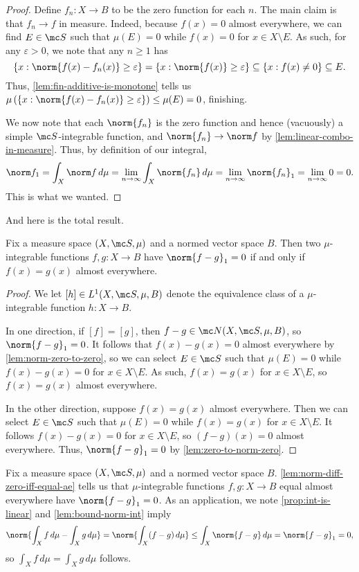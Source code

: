 \documentclass[../notes.tex]{subfiles}
\begin{document}
\begin{proof}
	Define $f_n\colon X\to B$ to be the zero function for each $n$. The main claim is that $f_n\to f$ in measure. Indeed, because $f(x)=0$ almost everywhere, we can find $E\in\mc S$ such that $\mu(E)=0$ while $f(x)=0$ for $x\in X\setminus E$. As such, for any $\varepsilon>0$, we note that any $n\ge1$ has
	\[\{x:\norm{f(x)-f_n(x)}\ge\varepsilon\}=\{x:\norm{f(x)}\ge\varepsilon\}\subseteq\{x:f(x)\ne0\}\subseteq E.\]
	Thus, \autoref{lem:fin-additive-is-monotone} tells us $\mu\left(\{x:\norm{f(x)-f_n(x)}\ge\varepsilon\}\right)\le\mu(E)=0$, finishing.
	
	We now note that each $\norm{f_n}$ is the zero function and hence (vacuously) a simple $\mc S$-integrable function, and $\norm{f_n}\to\norm f$ by \autoref{lem:linear-combo-in-measure}. Thus, by definition of our integral,
	\[\norm f_1=\int_X\norm f\,d\mu=\lim_{n\to\infty}\int_X\norm{f_n}\,d\mu=\lim_{n\to\infty}\norm{f_n}_1=\lim_{n\to\infty}0=0.\]
	This is what we wanted.
\end{proof}
And here is the total result.
\begin{lemma} \label{lem:norm-diff-zero-iff-equal-ae}
	Fix a measure space $(X,\mc S,\mu)$ and a normed vector space $B$. Then two $\mu$-integrable functions $f,g\colon X\to B$ have $\norm{f-g}_1=0$ if and only if $f(x)=g(x)$ almost everywhere.
\end{lemma}
\begin{proof}
	We let $[h]\in L^1(X,\mc S,\mu,B)$ denote the equivalence class of a $\mu$-integrable function $h\colon X\to B$.

	In one direction, if $[f]=[g]$, then $f-g\in\mc N(X,\mc S,\mu,B)$, so $\norm{f-g}_1=0$. It follows that $f(x)-g(x)=0$ almost everywhere by \autoref{lem:norm-zero-to-zero}, so we can select $E\in\mc S$ such that $\mu(E)=0$ while $f(x)-g(x)=0$ for $x\in X\setminus E$. As such, $f(x)=g(x)$ for $x\in X\setminus E$, so $f(x)=g(x)$ almost everywhere.

	In the other direction, suppose $f(x)=g(x)$ almost everywhere. Then we can select $E\in\mc S$ such that $\mu(E)=0$ while $f(x)=g(x)$ for $x\in X\setminus E$. It follows $f(x)-g(x)=0$ for $x\in X\setminus E$, so $(f-g)(x)=0$ almost everywhere. Thus, $\norm{f-g}_1=0$ by \autoref{lem:zero-to-norm-zero}.
\end{proof}
\begin{remark} \label{rem:equal-ae-gives-equal-ints}
	Fix a measure space $(X,\mc S,\mu)$ and a normed vector space $B$. \autoref{lem:norm-diff-zero-iff-equal-ae} tells us that $\mu$-integrable functions $f,g\colon X\to B$ equal almost everywhere have $\norm{f-g}_1=0$. As an application, we note \autoref{prop:int-is-linear} and \autoref{lem:bound-norm-int} imply
	\[\norm{\int_Xf\,d\mu-\int_Xg\,d\mu}=\norm{\int_X(f-g)\,d\mu}\le\int_X\norm{f-g}\,d\mu=\norm{f-g}_1=0,\]
	so $\int_Xf\,d\mu=\int_Xg\,d\mu$ follows.
\end{remark}
\end{document}
